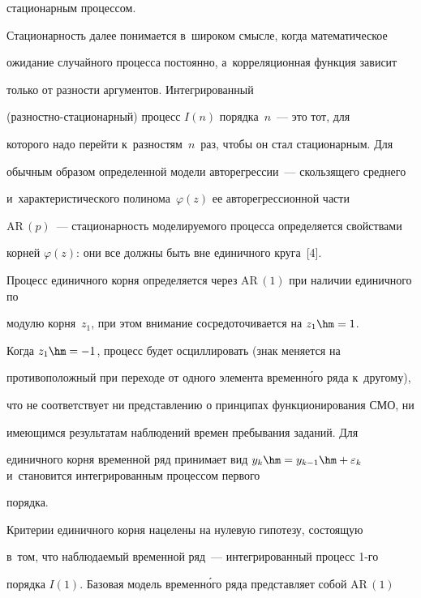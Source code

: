 стационарным процессом. 





     Стационарность далее понимается в~широком смысле, когда математическое 


ожидание случайного процесса постоянно, а~корреляционная функция зависит 


только от раз\-ности аргументов. Интегрированный  


(раз\-ност\-но-ста\-ци\-о\-нар\-ный) процесс $I(n)$ порядка~$n$~--- это тот, для 


которого надо перейти к~разностям~$n$~раз, чтобы он стал стационарным. Для 


обычным образом определенной модели авторегрессии~--- сколь\-зя\-ще\-го сред\-не\-го 


и~характеристического полинома~$\varphi(z)$ ее авторегрессионной части 


$\mathrm{AR}\,(p)$~--- ста\-ци\-о\-нар\-ность моделируемого процесса определяется свойствами 


корней $\varphi(z)$: они все долж\-ны быть вне единичного круга~[4].


     


     Процесс единичного корня определяется через  $\mathrm{AR}\,(1)$ при наличии единичного по 


модулю корня~$z_1$, при этом внимание сосредоточивается на $z_1\hm=1$. 


Когда $z_1\hm=-1$, процесс будет осциллировать (знак меняется на 


противоположный при переходе от одного элемента временн\'{о}го ряда к~другому), 


что не соответствует ни представлению о принципах функционирования СМО, ни 


име\-ющим\-ся результатам наблюдений времен пребывания заданий. Для 


единичного корня временной ряд принимает вид $y_k\hm=  


y_{k-1}\hm+\varepsilon_k$ и~становится интегрированным процессом первого 


порядка. 


     


     Критерии единичного корня нацелены на нулевую гипотезу, состоящую 


в~том, что наблюдаемый временной ряд~--- интегрированный процесс 1-го 


порядка $I(1)$. Базовая модель временн\'{о}го ряда пред\-став\-ля\-ет собой $\mathrm{AR}\,(1)$ 


